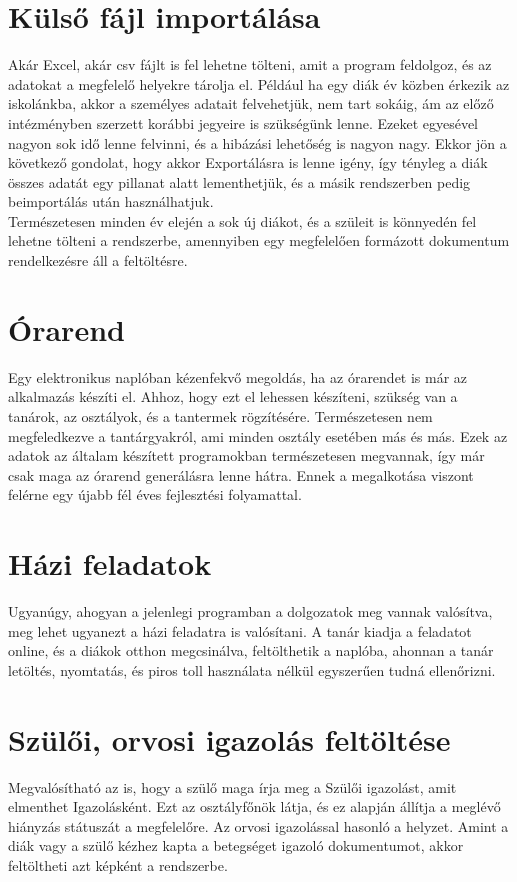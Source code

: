 \documentclass[
]{thesis-ekf}
\begin{document}
\section{Külső fájl importálása}
Akár Excel, akár csv fájlt is fel lehetne tölteni, amit a program feldolgoz, és az adatokat a megfelelő helyekre tárolja el. Például ha egy diák év közben érkezik az iskolánkba, akkor a személyes adatait felvehetjük, nem tart sokáig, ám az előző intézményben szerzett korábbi jegyeire is szükségünk lenne. Ezeket egyesével nagyon sok idő lenne felvinni, és a hibázási lehetőség is nagyon nagy. Ekkor jön a következő gondolat, hogy akkor Exportálásra is lenne igény, így tényleg a diák összes adatát egy pillanat alatt lementhetjük, és a másik rendszerben pedig beimportálás után használhatjuk.\\
Természetesen minden év elején a sok új diákot, és a szüleit is könnyedén fel lehetne tölteni a rendszerbe, amennyiben egy megfelelően formázott dokumentum rendelkezésre áll a feltöltésre.
\section{Órarend}
Egy elektronikus naplóban kézenfekvő megoldás, ha az órarendet is már az alkalmazás készíti el. Ahhoz, hogy ezt el lehessen készíteni, szükség van a tanárok, az osztályok, és a tantermek rögzítésére. Természetesen nem megfeledkezve a tantárgyakról, ami minden osztály esetében más és más. Ezek az adatok az általam készített programokban természetesen megvannak, így már csak maga az órarend generálásra lenne hátra. Ennek a megalkotása viszont felérne egy újabb fél éves fejlesztési folyamattal.
\section{Házi feladatok}
Ugyanúgy, ahogyan a jelenlegi programban a dolgozatok meg vannak valósítva, meg lehet ugyanezt a házi feladatra is valósítani. A  tanár kiadja a feladatot online, és a diákok otthon megcsinálva, feltölthetik a naplóba, ahonnan a tanár letöltés, nyomtatás, és piros toll használata nélkül egyszerűen tudná ellenőrizni. 
\section{Szülői, orvosi igazolás feltöltése}
Megvalósítható az is, hogy a szülő maga írja meg a Szülői igazolást, amit elmenthet Igazolásként. Ezt az osztályfőnök látja, és ez alapján állítja a meglévő hiányzás státuszát a megfelelőre. Az orvosi igazolással hasonló a helyzet. Amint a diák vagy a szülő kézhez kapta a betegséget igazoló dokumentumot, akkor feltöltheti azt képként a rendszerbe.
\end{document}
